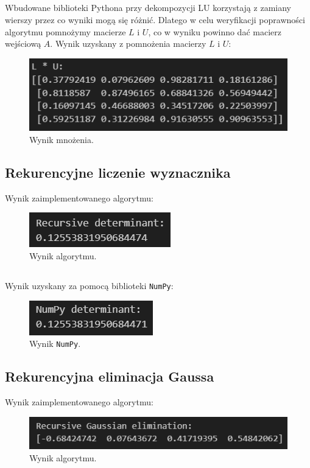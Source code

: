 \documentclass[11pt, leqno]{scrartcl}
\begin{document}
    \subsection*{}
    Wbudowane biblioteki Pythona przy dekompozycji LU korzystają
    z zamiany wierszy przez co wyniki mogą się różnić. Dlatego
    w celu weryfikacji poprawności algorytmu pomnożymy macierze
    $L$ i $U$, co w wyniku powinno dać macierz wejściową $A$.
    Wynik uzyskany z pomnożenia macierzy $L$ i $U$:
    \begin{figure}[H]
        \centering
        \includegraphics[width=0.7\linewidth]{por_lu_np.png}
        \caption{Wynik mnożenia.}
    \end{figure}

    \subsection{Rekurencyjne liczenie wyznacznika}
    Wynik zaimplementowanego algorytmu:
    \begin{figure}[H]
        \centering
        \includegraphics[width=0.4\linewidth]{por_det_alg.png}
        \caption{Wynik algorytmu.}
    \end{figure}
    \subsection*{}
    Wynik uzyskany za pomocą biblioteki \texttt{NumPy}:
    \begin{figure}[H]
        \centering
        \includegraphics[width=0.4\linewidth]{por_det_np.png}
        \caption{Wynik \texttt{NumPy}.}
    \end{figure}

    \subsection{Rekurencyjna eliminacja Gaussa}
    Wynik zaimplementowanego algorytmu:
    \begin{figure}[H]
        \centering
        \includegraphics[width=0.7\linewidth]{por_gauss_alg.png}
        \caption{Wynik algorytmu.}
    \end{figure}
\end{document}
